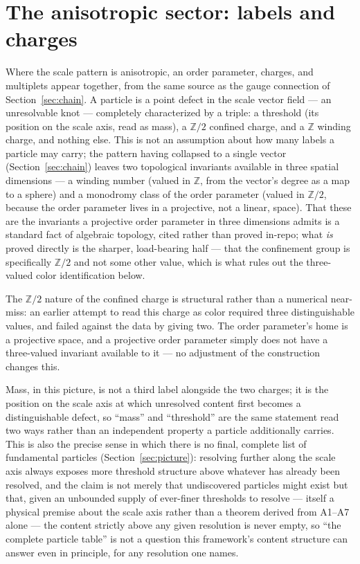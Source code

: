 \documentclass[pdflatex,sn-mathphys-num]{sn-jnl}
\theoremstyle{thmstyleone}
\theoremstyle{thmstylethree}
\theoremstyle{thmstyletwo}
\begin{document}
\section{The anisotropic sector: labels and charges}\label{sec:particles}

Where the scale pattern is anisotropic, an order parameter, charges, and
multiplets appear together, from the same source as the gauge connection
of Section~\ref{sec:chain}. A particle is a point defect in the scale
vector field — an unresolvable knot — completely characterized by a
triple: a threshold (its position on the scale axis, read as mass), a
$\mathbb{Z}/2$ confined charge, and a $\mathbb{Z}$ winding charge, and
nothing else. This is not an assumption about how many labels a particle
may carry; the pattern having collapsed to a single vector
(Section~\ref{sec:chain}) leaves two topological invariants available in
three spatial dimensions — a winding number (valued in $\mathbb{Z}$,
from the vector's degree as a map to a sphere) and a monodromy class of
the order parameter (valued in $\mathbb{Z}/2$, because the order
parameter lives in a projective, not a linear, space). That these are
the invariants a projective order parameter in three dimensions admits
is a standard fact of algebraic topology, cited rather than proved
in-repo; what \emph{is} proved directly is the sharper, load-bearing
half — that the confinement group is specifically $\mathbb{Z}/2$ and not
some other value, which is what rules out the three-valued color
identification below.

The $\mathbb{Z}/2$ nature of the confined charge is structural rather
than a numerical near-miss: an earlier attempt to read this charge as
color required three distinguishable values, and failed against the data
by giving two. The order parameter's home is a projective space, and a
projective order parameter simply does not have a three-valued invariant
available to it — no adjustment of the construction changes this.

Mass, in this picture, is not a third label alongside the two charges; it
is the position on the scale axis at which unresolved content first
becomes a distinguishable defect, so ``mass'' and ``threshold'' are the
same statement read two ways rather than an independent property a
particle additionally carries. This is also the precise sense in which
there is no final, complete list of fundamental particles
(Section~\ref{sec:picture}): resolving further along the scale axis
always exposes more threshold structure above whatever has already been
resolved, and the claim is not merely that undiscovered particles might
exist but that, given an unbounded supply of ever-finer thresholds to
resolve — itself a physical premise about the scale axis rather than a
theorem derived from A1–A7 alone — the content strictly above any given
resolution is never empty, so ``the complete particle table'' is not a
question this framework's content structure can answer even in
principle, for any resolution one names.
\end{document}
